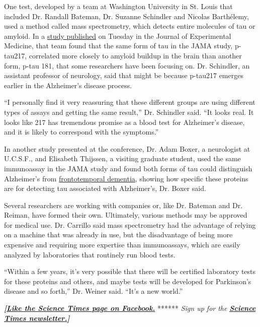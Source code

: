 One test, developed by a team at Washington University in St. Louis that
included Dr. Randall Bateman, Dr. Suzanne Schindler and Nicolas
Barthélemy, used a method called mass spectrometry, which detects entire
molecules of tau or amyloid. In a
\href{https://rupress.org/jem/article-lookup/doi/10.1084/jem.20200861}{study
published} on Tuesday in the Journal of Experimental Medicine, that team
found that the same form of tau in the JAMA study, p-tau217, correlated
more closely to amyloid buildup in the brain than another form, p-tau
181, that some researchers have been focusing on. Dr. Schindler, an
assistant professor of neurology, said that might be because p-tau217
emerges earlier in the Alzheimer's disease process.

``I personally find it very reassuring that these different groups are
using different types of assays and getting the same result,'' Dr.
Schindler said. ``It looks real. It looks like 217 has tremendous
promise as a blood test for Alzheimer's disease, and it is likely to
correspond with the symptoms.''

In another study presented at the conference, Dr. Adam Boxer, a
neurologist at U.C.S.F., and Elisabeth Thijssen, a visiting graduate
student, used the same immunoassay in the JAMA study and found both
forms of tau could distinguish Alzheimer's from
\href{https://www.nytimes3xbfgragh.onion/2012/05/06/health/a-rare-form-of-dementia-tests-a-vow-of-for-better-for-worse.html}{frontotemporal
dementia}, showing how specific these proteins are for detecting tau
associated with Alzheimer's, Dr. Boxer said.

Several researchers are working with companies or, like Dr. Bateman and
Dr. Reiman, have formed their own. Ultimately, various methods may be
approved for medical use. Dr. Carrillo said mass spectrometry had the
advantage of relying on a machine that was already in use, but the
disadvantage of being more expensive and requiring more expertise than
immunoassays, which are easily analyzed by laboratories that routinely
run blood tests.

``Within a few years, it's very possible that there will be certified
laboratory tests for these proteins and others, and maybe tests will be
developed for Parkinson's disease and so forth,'' Dr. Weiner said.
``It's a new world.''

\textbf{\emph{{[}}\href{http://on.fb.me/1paTQ1h}{\emph{Like the Science
Times page on Facebook.}}} ****** \emph{\textbar{} Sign up for the}
\textbf{\href{http://nyti.ms/1MbHaRU}{\emph{Science Times
newsletter.}}\emph{{]}}}

